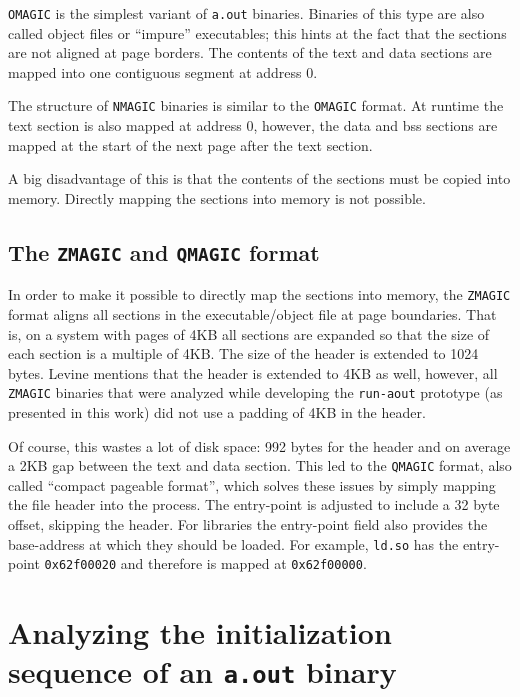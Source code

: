 \documentclass[draft,final]{vutinfth} %
\begin{document}
\texttt{OMAGIC} is the simplest variant of \texttt{a.out} binaries. Binaries of this type are also called object files or ``impure'' executables; this hints at the fact that the sections are not aligned at page borders. The contents of the text and data sections are mapped into one contiguous segment at address 0.

The structure of \texttt{NMAGIC} binaries is similar to the \texttt{OMAGIC} format. At runtime the text section is also mapped at address 0, however, the data and bss sections are mapped at the start of the next page after the text section.

A big disadvantage of this is that the contents of the sections must be copied into memory. Directly mapping the sections into memory is not possible.

\subsection{The \texttt{ZMAGIC} and \texttt{QMAGIC} format}
\label{formatdesc_zqmagic}

In order to make it possible to directly map the sections into memory, the \texttt{ZMAGIC} format aligns all sections in the executable/object file at page boundaries.\cite[page 53]{Levine} That is, on a system with pages of 4KB all sections are expanded so that the size of each section is a multiple of 4KB. The size of the header is extended to 1024 bytes. Levine\cite[page 53]{Levine} mentions that the header is extended to 4KB as well, however, all \texttt{ZMAGIC} binaries that were analyzed while developing the \texttt{run-aout} prototype (as presented in this work) did not use a padding of 4KB in the header.

Of course, this wastes a lot of disk space: 992 bytes for the header and on average a 2KB gap between the text and data section. This led to the \texttt{QMAGIC} format, also called ``compact pageable format''\cite[page 53]{Levine}, which solves these issues by simply mapping the file header into the process. The entry-point is adjusted to include a 32 byte offset, skipping the header. For libraries the entry-point field also provides the base-address at which they should be loaded. For example, \texttt{ld.so} has the entry-point \texttt{0x62f00020} and therefore is mapped at \texttt{0x62f00000}.

\section{Analyzing the initialization sequence of an \texttt{a.out} binary}
\end{document}
